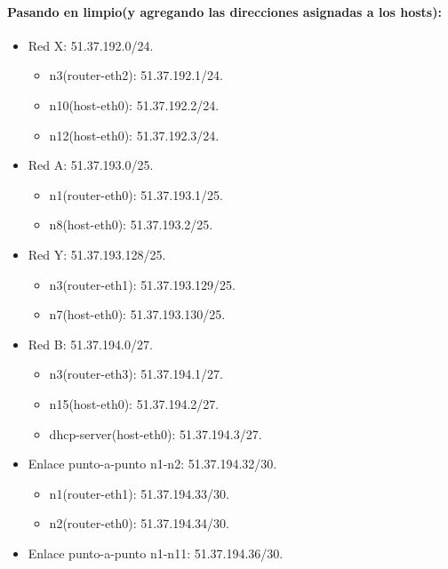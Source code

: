 \documentclass[11pt]{article} %
\begin{document}
        \paragraph{Pasando en limpio(y agregando las direcciones asignadas a los hosts):}
        \begin{itemize}
            \item Red X: 51.37.192.0/24.
            \begin{itemize}
                \item n3(router-eth2): 51.37.192.1/24.
                \item n10(host-eth0): 51.37.192.2/24.
                \item n12(host-eth0): 51.37.192.3/24.
            \end{itemize}
            \item Red A: 51.37.193.0/25.
            \begin{itemize}
                \item n1(router-eth0): 51.37.193.1/25.
                \item n8(host-eth0): 51.37.193.2/25.
            \end{itemize}
            \item Red Y: 51.37.193.128/25.
            \begin{itemize}
                \item n3(router-eth1): 51.37.193.129/25.
                \item n7(host-eth0): 51.37.193.130/25.
            \end{itemize}
            \item Red B: 51.37.194.0/27.
            \begin{itemize}
                \item n3(router-eth3): 51.37.194.1/27.
                \item n15(host-eth0): 51.37.194.2/27.
                \item dhcp-server(host-eth0): 51.37.194.3/27.
            \end{itemize}
            \item Enlace punto-a-punto n1-n2: 51.37.194.32/30.
            \begin{itemize}
                \item n1(router-eth1): 51.37.194.33/30.
                \item n2(router-eth0): 51.37.194.34/30.
            \end{itemize}
            \item Enlace punto-a-punto n1-n11: 51.37.194.36/30.

\end{itemize}
\end{document}
